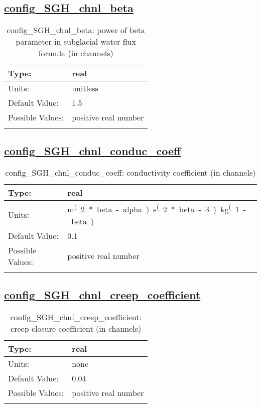 \subsection[config\_SGH\_chnl\_beta]{\hyperref[sec:nm_tab_subglacial_hydro]{config\_SGH\_chnl\_beta}}
\label{subsec:nm_sec_config_SGH_chnl_beta}
\begin{center}
\begin{longtable}{| p{2.0in} || p{4.0in} |}
    \hline
    Type: & real \\
    \hline
    Units: & \si{unitless} \\
    \hline
    Default Value: & 1.5 \\
    \hline
    Possible Values: & positive real number \\
    \hline
    \caption{config\_SGH\_chnl\_beta: power of beta parameter in subglacial water flux formula (in channels)}
\end{longtable}
\end{center}
\subsection[config\_SGH\_chnl\_conduc\_coeff]{\hyperref[sec:nm_tab_subglacial_hydro]{config\_SGH\_chnl\_conduc\_coeff}}
\label{subsec:nm_sec_config_SGH_chnl_conduc_coeff}
\begin{center}
\begin{longtable}{| p{2.0in} || p{4.0in} |}
    \hline
    Type: & real \\
    \hline
    Units: & \si{m^(2*beta-alpha).s^(2*beta-3).kg^(1-beta)} \\
    \hline
    Default Value: & 0.1 \\
    \hline
    Possible Values: & positive real number \\
    \hline
    \caption{config\_SGH\_chnl\_conduc\_coeff: conductivity coefficient (in channels)}
\end{longtable}
\end{center}
\subsection[config\_SGH\_chnl\_creep\_coefficient]{\hyperref[sec:nm_tab_subglacial_hydro]{config\_SGH\_chnl\_creep\_coefficient}}
\label{subsec:nm_sec_config_SGH_chnl_creep_coefficient}
\begin{center}
\begin{longtable}{| p{2.0in} || p{4.0in} |}
    \hline
    Type: & real \\
    \hline
    Units: & \si{none} \\
    \hline
    Default Value: & 0.04 \\
    \hline
    Possible Values: & positive real number \\
    \hline
    \caption{config\_SGH\_chnl\_creep\_coefficient: creep closure coefficient (in channels)}
\end{longtable}
\end{center}

